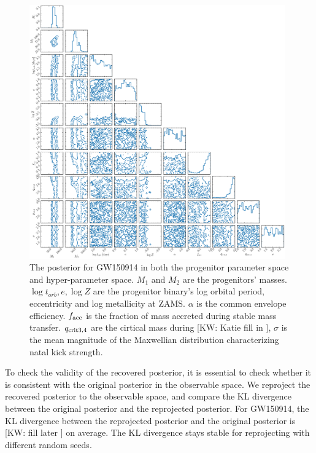 \documentclass[twocolumn]{aastex631}
\newcommand{\kw}[1]{{\color{rb4}[KW: #1 ]}}
\begin{document}
\begin{figure}
\includegraphics[width=0.98\textwidth]{static/GW150914_corner.pdf}
\caption{The posterior for GW150914 in both the progenitor parameter space and hyper-parameter space.
$M_1$ and $M_2$ are the progenitors' masses. $\log{t_{orb}}, e, \log{Z}$ are the progenitor binary's log orbital period, eccentricity and log metallicity at ZAMS.
$\alpha$ is the common envelope efficiency.
$f_{\rm acc}$ is the fraction of mass accreted during stable mass transfer.
$q_{\rm crit 3,4}$ are the cirtical mass during \kw{Katie fill in},
$\sigma$ is the mean magnitude of the Maxwellian distribution characterizing natal kick strength.
}
\label{fig:GW150914_posterior}
\end{figure}

To check the validity of the recovered posterior, it is essential to check whether it is consistent with the original posterior in the observable space.
We reproject the recovered posterior to the observable space, and compare the KL divergence between the original posterior and the reprojected posterior.
For GW150914, the KL divergence between the reprojected posterior and the original posterior is \kw{fill later} on average.
The KL divergence stays stable for reprojecting with different random seeds.
\end{document}
